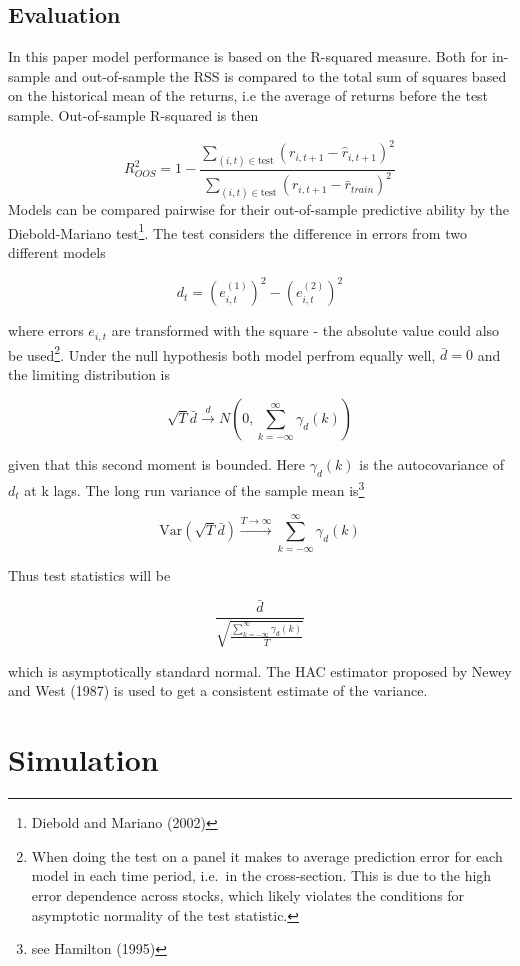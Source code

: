 \documentclass[11pt]{article}
\let\rmarkdownfootnote\footnote%
\def\footnote{\protect\rmarkdownfootnote}
\begin{document}
\hypertarget{evaluation}{%
\subsection{Evaluation}\label{evaluation}}

In this paper model performance is based on the R-squared measure. Both
for in-sample and out-of-sample the RSS is compared to the total sum of
squares based on the historical mean of the returns, i.e the average of
returns before the test sample. Out-of-sample R-squared is then

\[
R^2_{OOS} = 1 - \frac{\sum_{(i,t)\in\mathrm{test}} (r_{i,t+1} - \hat{r}_{i,t+1} )^2}{\sum_{(i,t)\in\mathrm{test}} (r_{i,t+1}- \bar{r}_{train})^2 }
\] Models can be compared pairwise for their out-of-sample predictive
ability by the Diebold-Mariano test\footnote{Diebold and Mariano (2002)}.
The test considers the difference in errors from two different models

\[d_t = \left(e_{i,t}^{(1)}\right)^2 - \left(e_{i,t}^{(2)}\right)^2\]

where errors \(e_{i,t}\) are transformed with the square - the absolute
value could also be used\footnote{When doing the test on a panel it makes
  to average prediction error for each model in each time period,
  i.e.~in the cross-section. This is due to the high error dependence
  across stocks, which likely violates the conditions for asymptotic
  normality of the test statistic.}. Under the null hypothesis both
model perfrom equally well, \(\bar{d}= 0\) and the limiting distribution
is

\[\sqrt{T}\bar{d} \xrightarrow[]{d} N\left(0, \sum_{k=-\infty}^{\infty} \gamma_d(k)\right)\]

given that this second moment is bounded. Here \(\gamma_d(k)\) is the autocovariance of \(d_t\) at k lags. The long run variance of the sample mean is\footnote{see Hamilton (1995)}

\[\mathrm{Var}(\sqrt{T}\bar{d}) \xrightarrow[]{T\rightarrow \infty} \sum_{k=-\infty}^{\infty} \gamma_d(k)\]

Thus test statistics will be

\[\frac{\bar{d}}{\sqrt{ \frac{\sum_{k=-\infty}^{\infty} \gamma_d(k)}{T}  }}\]

which is asymptotically standard normal. The HAC estimator proposed by
Newey and West (1987) is used to get a consistent estimate of the
variance.

\hypertarget{simulation}{%
\section{Simulation}\label{simulation}}
\end{document}
